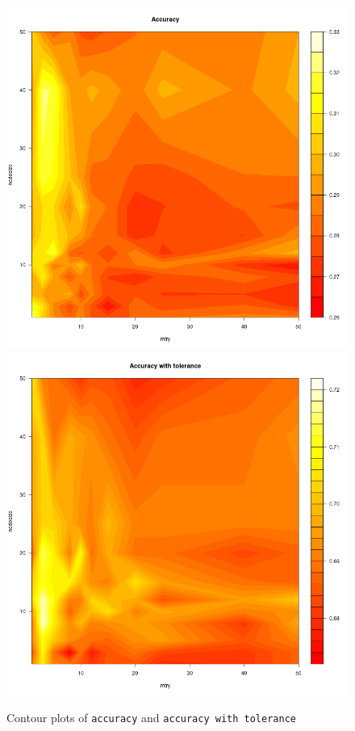 \documentclass{article}
\begin{document}
\begin{figure}[H]
    \includegraphics*[scale=0.25]{figures/contour_plot_accuracy.png}
    \includegraphics*[scale=0.25]{figures/contour_plot_accuracy_with_tolerance.png}
    \caption{Contour plots of \texttt{accuracy} and \texttt{accuracy with tolerance}}
    \label{fig:contour}
\end{figure}
\end{document}
